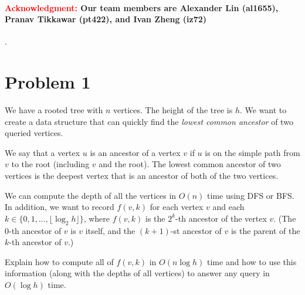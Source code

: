 \paragraph{\textcolor{red}{Acknowledgment:} Our team members are \textbf{Alexander Lin (al1655)}, \textbf{Pranav Tikkawar (pt422)}, and \textbf{Ivan Zheng (iz72)}}.


\section*{Problem 1}
We have a rooted tree with $n$ vertices. The height of the tree is $h$. We want to create a data structure that can quickly find the \emph{lowest common ancestor} of two queried vertices.

We say that a vertex $u$ is an ancestor of a vertex $v$ if $u$ is on the simple path from $v$ to the root (including $v$ and the root). The lowest common ancestor of two vertices is the deepest vertex that is an ancestor of both of the two vertices.

We can compute the depth of all the vertices in $O(n)$ time using DFS or BFS. In addition, we want to record $f(v, k)$ for each vertex $v$ and each $k \in \{0, 1, \ldots, \lfloor \log_2 h \rfloor\}$, where $f(v, k)$ is the $2^k$-th ancestor of the vertex $v$. (The $0$-th ancestor of $v$ is $v$ itself, and the $(k+1)$-st ancestor of $v$ is the parent of the $k$-th ancestor of $v$.)

Explain how to compute all of $f(v, k)$ in $O(n \log h)$ time and how to use this information (along with the depths of all vertices) to answer any query in $O(\log h)$ time.

